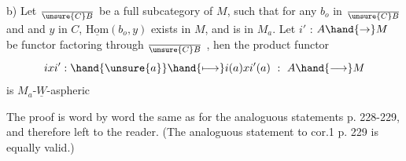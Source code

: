 b) Let $\over{\unsure{C}}{B}$ be a full subcategory of $M$, such that for any $b_o$ in $\over{\unsure{C}}{B}$  and
and $y$ in $C$,  $\underline{\mathrm{Hom}}(b_o,y)$  exists in $M$, and is in $M_a$.  Let $i'$ : $A \hand{\to} M$
be  functor factoring through $\over{\unsure{C}}{B}$ , hen the product functor 
\[ ixi' : \hand{\unsure{a}} \hand{\longmapsto} i(a)xi'(a) \ : \ A \hand{\longrightarrow} M \]
is $M_a$-$\underline{W}$-aspheric 

The proof is word by word the same as for the analoguous statements
p. 228-229, and therefore left to the reader. (The analoguous statement
to cor.1  p. 229 is equally valid.)

